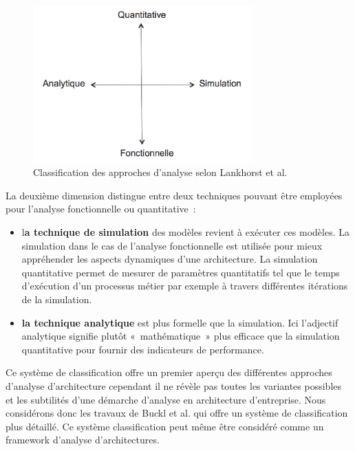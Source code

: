 \begin{figure}[!htbp]
 \begin{center}
  \includegraphics[width=0.75\textwidth]{images/Chapitre1/dimesionsLankhorts.png}
 \end{center}
 \caption{Classification des approches d'analyse selon Lankhorst et al. \protect\cite{lankhorst2009enterprise}}
 \label{fig:classLankhorst}
\end{figure}

La deuxième dimension distingue entre deux techniques pouvant être employées pour l'analyse fonctionnelle ou quantitative~:
	\begin{itemize}
		\item l\textbf{a technique de simulation} des modèles revient à exécuter ces modèles. La simulation dans le cas de l'analyse fonctionnelle est utilisée pour mieux appréhender les aspects dynamiques d'une architecture. La simulation quantitative permet de mesurer de paramètres quantitatifs tel que le temps d'exécution d'un processus métier par exemple à travers différentes itérations de la simulation. 
		\item \textbf{la technique analytique} est plus formelle que la simulation. Ici l'adjectif analytique signifie plutôt «~mathématique~» plus efficace que la simulation quantitative pour fournir des indicateurs de performance.  
	\end{itemize}
	
Ce système de classification offre un premier aperçu des différentes approches d'analyse d'architecture cependant il ne révèle pas toutes les variantes possibles et les subtilités d'une démarche d'analyse en architecture d'entreprise. Nous considérons donc les travaux de Buckl  et al. qui offre un système de classification plus détaillé. Ce système classification peut même être considéré comme un framework d'analyse d'architectures.

